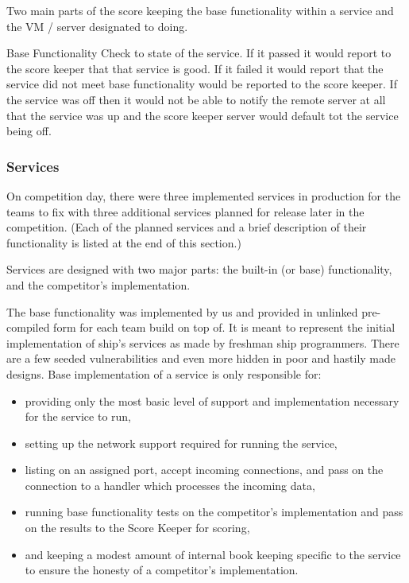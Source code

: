 \documentclass[10pt]{article}
\begin{document}
Two main parts of the score keeping the base functionality within a service and
the VM / server designated to doing.

Base Functionality 
Check to state of the service.
If it passed it would report to the score keeper that that service is good.
If it failed it would report that the service did not meet base functionality would
be reported to the score keeper.
If the service was off then it would not be able to notify the remote server at all
that the service was up and the score keeper server would default tot the service
being off.

\subsubsection{Services}
\label{stservices}
On competition day, there were three implemented services in production for the
teams to fix with three additional services planned for release later in the
competition. (Each of the planned services and a brief description of their
functionality is listed at the end of this section.)

Services are designed with two major parts: the built-in (or base)
functionality, and the competitor's implementation.

The base functionality was implemented by us and provided in unlinked
pre-compiled form for each team build on top of. It is meant to represent the
initial implementation of ship's services as made by freshman ship programmers.
There are a few seeded vulnerabilities and even more hidden in poor and hastily
made designs. Base implementation of a service is only responsible for:

\begin{itemize}
    \item providing only the most basic level of support and implementation
    necessary for the service to run, 
    \item setting up the network support required for running the service,
    \item listing on an assigned port, accept incoming connections, and pass on
    the connection to a handler which processes the incoming data,
    \item running base functionality tests on the competitor's implementation and
    pass on the results to the Score Keeper for scoring,
    \item and keeping a modest amount of internal book keeping specific to the
    service to ensure the honesty of a competitor's implementation.
\end{itemize}
\end{document}
